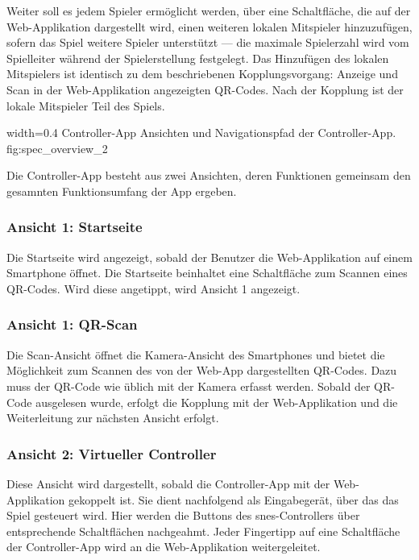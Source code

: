 Weiter soll es jedem Spieler ermöglicht werden, über eine Schaltfläche,
die auf der Web-Applikation dargestellt wird, einen weiteren lokalen
Mitspieler hinzuzufügen, sofern das Spiel weitere Spieler unterstützt
--- die maximale Spielerzahl wird vom Spielleiter während der
Spielerstellung festgelegt. Das Hinzufügen des lokalen Mitspielers ist
identisch zu dem beschriebenen Kopplungsvorgang: Anzeige und Scan in der
Web-Applikation angezeigten QR-Codes. Nach der Kopplung ist der lokale
Mitspieler Teil des Spiels.

   {width=0.4\textwidth}
   {Controller-App}
   {Ansichten und Navigationspfad der Controller-App.}
   {fig:spec_overview_2}

Die Controller-App besteht aus zwei Ansichten, deren Funktionen
gemeinsam den gesamnten Funktionsumfang der App ergeben.

\subsubsection{Ansicht 1: Startseite}\label{ansicht-1-startseite-1}

Die Startseite wird angezeigt, sobald der Benutzer die Web-Applikation
auf einem Smartphone öffnet. Die Startseite beinhaltet eine Schaltfläche
zum Scannen eines QR-Codes. Wird diese angetippt, wird Ansicht 1
angezeigt.

\subsubsection{Ansicht 1: QR-Scan}\label{ansicht-1-qr-scan}

Die Scan-Ansicht öffnet die Kamera-Ansicht des Smartphones und bietet
die Möglichkeit zum Scannen des von der Web-App dargestellten QR-Codes.
Dazu muss der QR-Code wie üblich mit der Kamera erfasst werden. Sobald
der QR-Code ausgelesen wurde, erfolgt die Kopplung mit der
Web-Applikation und die Weiterleitung zur nächsten Ansicht erfolgt.

\subsubsection{Ansicht 2: Virtueller
Controller}\label{ansicht-2-virtueller-controller}

Diese Ansicht wird dargestellt, sobald die Controller-App mit der
Web-Applikation gekoppelt ist. Sie dient nachfolgend als Eingabegerät,
über das das Spiel gesteuert wird. Hier werden die Buttons des
\gls{snes}-Controllers über entsprechende Schaltflächen nachgeahmt.
Jeder Fingertipp auf eine Schaltfläche der Controller-App wird an die
Web-Applikation weitergeleitet.

